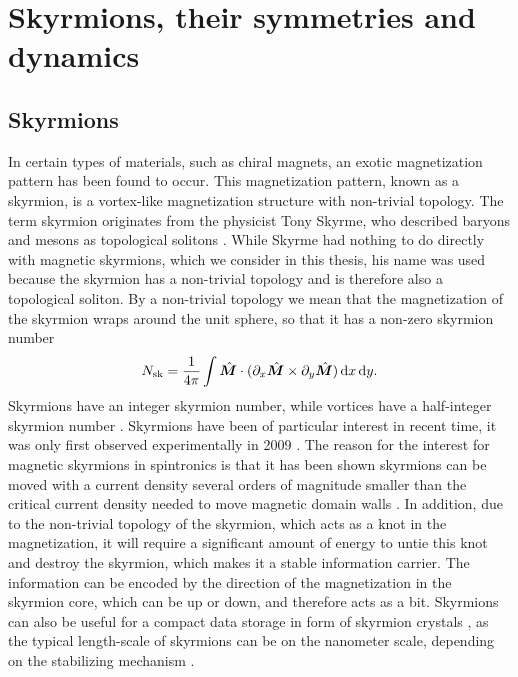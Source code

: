 \chapter{Skyrmions, their symmetries and dynamics}

\section{Skyrmions} \label{sec:Skyrmions}
In certain types of materials, such as chiral magnets, an exotic magnetization pattern has been found to occur. This magnetization pattern, known as a skyrmion, is a vortex-like magnetization structure with non-trivial topology. The term skyrmion originates from the physicist Tony Skyrme, who described baryons and mesons as topological solitons \cite{Skyrme1962}. While Skyrme had nothing to do directly with magnetic skyrmions, which we consider in this thesis, his name was used because the skyrmion has a non-trivial topology and is therefore also a topological soliton. By a non-trivial topology we mean that the magnetization of the skyrmion wraps around the unit sphere, so that it has a non-zero skyrmion number \cite{Heinze2011}
\begin{align}
\label{eq:SkyrmionNumber}
N_{\textrm{sk}} = \frac{1}{4\pi}\int \mathbold{\hat{M}}\cdot(\partial_x \mathbold{\hat{M}} \times \partial_y \mathbold{\hat{M}}) \d x \d y.
\end{align}
Skyrmions have an integer skyrmion number, while vortices have a half-integer skyrmion number \cite{Tretiakov2007}. Skyrmions have been of particular interest in recent time, it was only first observed experimentally in 2009 \cite{Muhlbauer2009}. The reason for the interest for magnetic skyrmions in spintronics is that it has been shown skyrmions can be moved with a current density several orders of magnitude smaller than the critical current density needed to move magnetic domain walls \cite{Jonietz2010}. In addition, due to the non-trivial topology of the skyrmion, which acts as a knot in the magnetization, it will require a significant amount of energy to untie this knot and destroy the skyrmion, which makes it a stable information carrier. The information can be encoded by the direction of the magnetization in the skyrmion core, which can be up or down, and therefore acts as a bit. Skyrmions can also be useful for a compact data storage in form of skyrmion crystals \cite{Fert2013}, as the typical length-scale of skyrmions can be on the nanometer scale, depending on the stabilizing mechanism \cite{Nagaosa2013}. 

